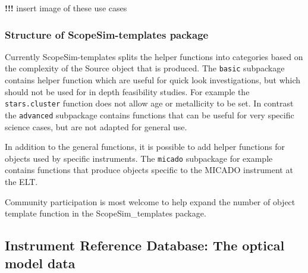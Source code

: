 \textbf{!!!} insert image of these use cases


\subsubsection{Structure of ScopeSim-templates package%
  \label{structure-of-scopesim-templates-package}%
}

Currently ScopeSim-templates splits the helper functions into categories based on the complexity of the Source object that is produced.
The \texttt{basic} subpackage contains helper function which are useful for quick look investigations, but which should not be used for in depth feasibility studies.
For example the \texttt{stars.cluster} function does not allow age or metallicity to be set.
In contrast the \texttt{advanced} subpackage contains functions that can be useful for very specific science cases, but are not adapted for general use.

In addition to the general functions, it is possible to add helper functions for objects used by specific instruments.
The \texttt{micado} subpackage for example contains functions that produce objects specific to the MICADO instrument at the ELT.

Community participation is most welcome to help expand the number of object template function in the ScopeSim\_templates package.


\subsection{Instrument Reference Database: The optical model data%
  \label{instrument-reference-database-the-optical-model-data}%
}

